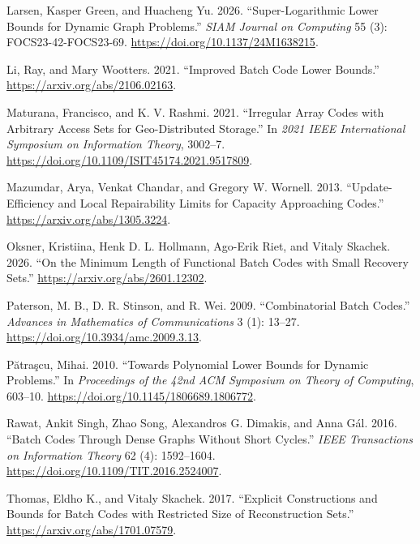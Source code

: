 \documentclass[
]{article}
\newlength{\cslhangindent}
\newlength{\cslentryspacingunit} %
\newenvironment{CSLReferences}[2] %
 {%
  \setlength{\parindent}{0pt}
  \ifodd #1
  \let\oldpar\par
  \def\par{\hangindent=\cslhangindent\oldpar}
  \fi
  \setlength{\parskip}{#2\cslentryspacingunit}
 }%
 {}
\begin{document}
\begin{CSLReferences}{1}{0}
\leavevmode{}%
Larsen, Kasper Green, and Huacheng Yu. 2026. {``Super-Logarithmic Lower
Bounds for Dynamic Graph Problems.''} \emph{SIAM Journal on Computing}
55 (3): FOCS23-42-FOCS23-69. \url{https://doi.org/10.1137/24M1638215}.

\leavevmode{}%
Li, Ray, and Mary Wootters. 2021. {``Improved Batch Code Lower
Bounds.''} \url{https://arxiv.org/abs/2106.02163}.

\leavevmode{}%
Maturana, Francisco, and K. V. Rashmi. 2021. {``Irregular Array Codes
with Arbitrary Access Sets for Geo-Distributed Storage.''} In \emph{2021
IEEE International Symposium on Information Theory}, 3002--7.
\url{https://doi.org/10.1109/ISIT45174.2021.9517809}.

\leavevmode{}%
Mazumdar, Arya, Venkat Chandar, and Gregory W. Wornell. 2013.
{``Update-Efficiency and Local Repairability Limits for Capacity
Approaching Codes.''} \url{https://arxiv.org/abs/1305.3224}.

\leavevmode{}%
Oksner, Kristiina, Henk D. L. Hollmann, Ago-Erik Riet, and Vitaly
Skachek. 2026. {``On the Minimum Length of Functional Batch Codes with
Small Recovery Sets.''} \url{https://arxiv.org/abs/2601.12302}.

\leavevmode{}%
Paterson, M. B., D. R. Stinson, and R. Wei. 2009. {``Combinatorial Batch
Codes.''} \emph{Advances in Mathematics of Communications} 3 (1):
13--27. \url{https://doi.org/10.3934/amc.2009.3.13}.

\leavevmode{}%
Pătraşcu, Mihai. 2010. {``Towards Polynomial Lower Bounds for Dynamic
Problems.''} In \emph{Proceedings of the 42nd ACM Symposium on Theory of
Computing}, 603--10. \url{https://doi.org/10.1145/1806689.1806772}.

\leavevmode{}%
Rawat, Ankit Singh, Zhao Song, Alexandros G. Dimakis, and Anna Gál.
2016. {``Batch Codes Through Dense Graphs Without Short Cycles.''}
\emph{IEEE Transactions on Information Theory} 62 (4): 1592--1604.
\url{https://doi.org/10.1109/TIT.2016.2524007}.

\leavevmode{}%
Thomas, Eldho K., and Vitaly Skachek. 2017. {``Explicit Constructions
and Bounds for Batch Codes with Restricted Size of Reconstruction
Sets.''} \url{https://arxiv.org/abs/1701.07579}.


\end{CSLReferences}
\end{document}
